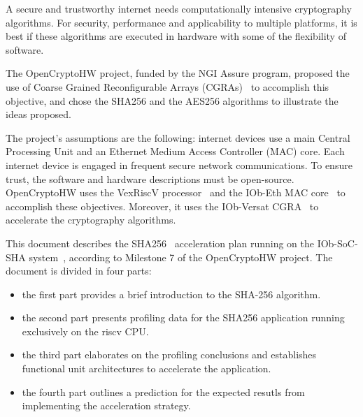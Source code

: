 A secure and trustworthy internet needs computationally intensive cryptography
algorithms. For security, performance and applicability to multiple platforms,
it is best if these algorithms are executed in hardware with some of the
flexibility of software.

The OpenCryptoHW project, funded by the NGI Assure program, proposed the use of
Coarse Grained Reconfigurable Arrays (CGRAs)~\cite{CGRA:Overview} to accomplish
this objective, and chose the SHA256 and the AES256 algorithms to illustrate
the ideas proposed.

The project's assumptions are the following: internet devices use a main
Central Processing Unit and an Ethernet Medium Access Controller (MAC) core.
Each internet device is engaged in frequent secure network communications. To
ensure trust, the software and hardware descriptions must be open-source.
OpenCryptoHW uses the VexRiscV processor~\cite{VexRiscv} and the IOb-Eth MAC
core~\cite{iob-eth} to accomplish these objectives. Moreover, it uses the
IOb-Versat CGRA~\cite{iob-versat} to accelerate the cryptography algorithms.

This document describes the SHA256~\cite{SHA_NIST_FIPS} acceleration plan
running on the IOb-SoC-SHA system~\cite{iob-soc-sha}, according to Milestone 7
of the OpenCryptoHW project. The document is divided in four parts:
\begin{itemize}
\item the first part provides a brief introduction to the SHA-256 algorithm.
\item the second part presents profiling data for the SHA256 application
    running exclusively on the riscv CPU.
\item the third part elaborates on the profiling conclusions and establishes
    functional unit architectures to accelerate the application.
\item the fourth part outlines a prediction for the expected resutls from
    implementing the acceleration strategy.
\end{itemize}










